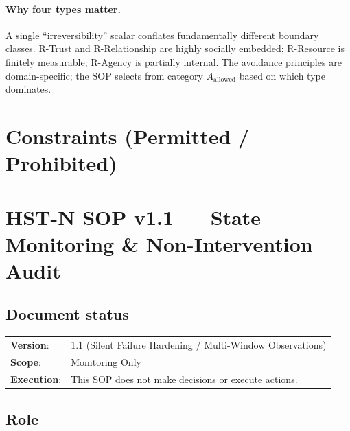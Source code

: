 \paragraph{Why four types matter.}
A single ``irreversibility'' scalar conflates fundamentally different
boundary classes. R-Trust and R-Relationship are highly socially
embedded; R-Resource is finitely measurable; R-Agency is partially
internal. The avoidance principles are domain-specific; the SOP
selects from category $A_{\mathrm{allowed}}$ based on which type
dominates.

\section{Constraints (Permitted / Prohibited)}
\label{sec:hstn-constraints}


\section{HST-N SOP v1.1 --- State Monitoring \& Non-Intervention
Audit}
\label{sec:hstn-sop-v11}

\subsection*{Document status}

\begin{tabular}{ll}
\textbf{Version}: & 1.1 (Silent Failure Hardening / Multi-Window
Observations) \\
\textbf{Scope}: & Monitoring Only \\
\textbf{Execution}: & This SOP does not make decisions or execute
actions.
\end{tabular}

\subsection{Role}
\label{sec:hstn-v11-role}

